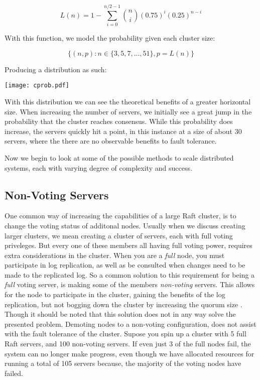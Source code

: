 \[L(n) = 1- \sum_{i=0}^{n/2-1} {n \choose i}(0.75)^{i}(0.25)^{n-i}\]

With this function, we model the probability given each cluster size: 

\[\{(n, p): n \in \{3,5,7,...,51\}, p=L(n)\}\]

\vskip 0.25in

Producing a distribution as such:

\vskip 0.25in

\texttt{[image: cprob.pdf]}


With this distribution we can see the theoretical benefits of a greater horizontal size. When increasing the number of servers, we initially see a great jump in the probability that the cluster reaches consensus. While this probability does increase, the servers quickly hit a point, in this instance at a size of about 30 servers, where the there are no observable benefits to fault tolerance.

Now we begin to look at some of the possible methods to scale distributed systems, each with varying degree of complexity and success.

\subsection{Non-Voting Servers}

One common way of increasing the capabilities of a large Raft cluster, is to change the voting status of additonal nodes.
Usually when we discuss creating larger clusters, we mean creating a cluster of servers, each with full voting priveleges.
But every one of these members all having full voting power, requires extra considerations in the cluster.
When you are a \textit{full} node, you must participate in log replication, as well as be consulted when changes need to be made to the replicated log.
So a common solution to this requirement for being a \textit{full} voting server, is making some of the members \textit{non-voting} servers.
This allows for the node to participate in the cluster, gaining the benefits of the log replication, but not bogging down the cluster by increasing the quorum size \cite{NonVoting}. 
Though it should be noted that this solution does not in any way solve the presented problem. Demoting nodes to a non-voting configuration, does not assist with the fault tolerance of the cluster. Supose you spin up a cluster with 5 full Raft servers, and 100 non-voting servers. If even just 3 of the full nodes fail, the system can no longer make progress, even though we have allocated resources for running a total of 105 servers because, the majority of the voting nodes have failed.

